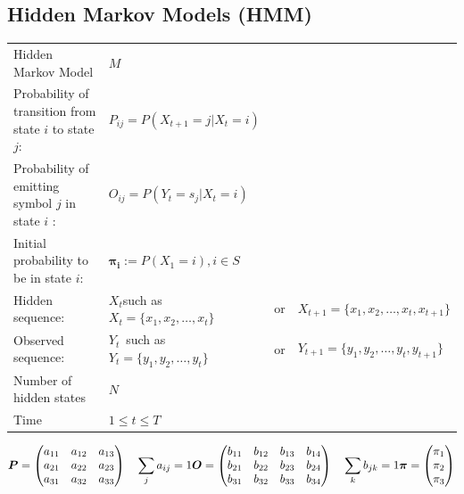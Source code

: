 \subsection{Hidden Markov Models (HMM) }

\renewcommand{\arraystretch}{1.5}
\begin{tabular}{llll}
Hidden Markov Model& $M$&&\\
Probability of transition from state $i$ to state $j$:&
$P_{ij}=P(X_{t+1}=j|X_t=i)$&&\\
Probability of emitting symbol $j$ in state $i$ :&
$O_{ij}=P(Y_{t}=s_j|X_t=i)$&&\\
Initial probability to be in state $i$:&
$\bm{\pi_i}:=P(X_1=i),i \in S$&&\\
Hidden sequence:&
 $X_t$\quad such as $X_t=\{x_1,x_2,\ldots,x_t\}$&or& $X_{t+1}=\{x_1,x_2,\ldots,x_t,x_{t+1}\}$\\
Observed sequence:&
 $Y_t$\quad ~such as $Y_t=\{y_1,y_2,\ldots,y_t\}$&or& $Y_{t+1}=\{y_1,y_2,\ldots,y_t,y_{t+1}\}$\\
Number of hidden states & $N$&&\\
Time & $1 \leq t \leq T$&&
\end{tabular}

\renewcommand{\arraystretch}{1.0}
\begin{equation}
	\boldsymbol{P}=\begin{pmatrix}
		a_{11} & a_{12} & a_{13}\\
		a_{21} & a_{22} & a_{23}\\
		a_{31} & a_{32} & a_{33}
	\end{pmatrix} \quad
	\sum\limits_j a_{ij} = 1\\ 
	\boldsymbol{O}=\begin{pmatrix}
		b_{11} & b_{12} & b_{13} & b_{14}\\
		b_{21} & b_{22} & b_{23} & b_{24}\\
		b_{31} & b_{32} & b_{33} & b_{34}\\
	\end{pmatrix} \quad
	\sum\limits_k b_{jk} = 1\\
	\boldsymbol{\pi}=\begin{pmatrix}
		\pi_1\\
		\pi_2\\
		\pi_3\\
	\end{pmatrix}\nonumber
\end{equation}

